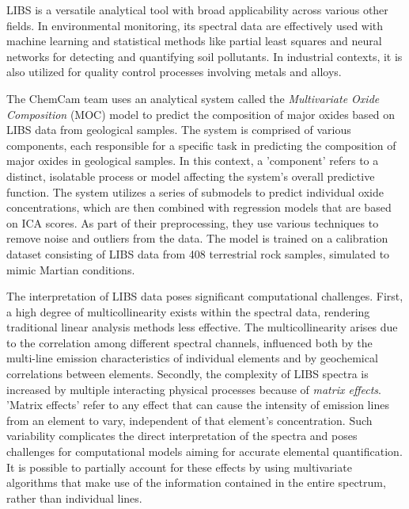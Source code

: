 LIBS is a versatile analytical tool with broad applicability across various other fields. In environmental monitoring, its spectral data are effectively used with machine learning and statistical methods like partial least squares and neural networks for detecting and quantifying soil pollutants. In industrial contexts, it is also utilized for quality control processes involving metals and alloys\cite{huang_progress_2023}.

The ChemCam team uses an analytical system called the \textit{Multivariate Oxide Composition} (MOC) model to predict the composition of major oxides based on LIBS data from geological samples. 
The system is comprised of various components, each responsible for a specific task in predicting the composition of major oxides in geological samples.
In this context, a 'component' refers to a distinct, isolatable process or model affecting the system's overall predictive function.
The system utilizes a series of submodels to predict individual oxide concentrations, which are then combined with regression models that are based on ICA scores.
As part of their preprocessing, they use various techniques to remove noise and outliers from the data.\cite{cleggRecalibrationMarsScience2017}
The model is trained on a calibration dataset consisting of LIBS data from 408 terrestrial rock samples, simulated to mimic Martian conditions\cite{cleggRecalibrationMarsScience2017}.

The interpretation of LIBS data poses significant computational challenges.
First, a high degree of multicollinearity exists within the spectral data, rendering traditional linear analysis methods less effective.
The multicollinearity arises due to the correlation among different spectral channels, influenced both by the multi-line emission characteristics of individual elements and by geochemical correlations between elements.
Secondly, the complexity of LIBS spectra is increased by multiple interacting physical processes because of \textit{matrix effects}. 'Matrix effects' refer to any effect that can cause the intensity of emission lines from an element to vary, independent of that element's concentration. Such variability complicates the direct interpretation of the spectra and poses challenges for computational models aiming for accurate elemental quantification.
It is possible to partially account for these effects by using multivariate algorithms that make use of the information contained in the entire spectrum, rather than individual lines.\cite{andersonImprovedAccuracyQuantitative2017}

